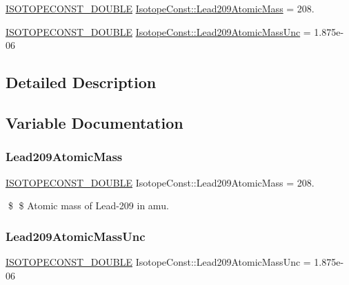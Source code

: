 \begin{DoxyCompactItemize}
\item 
\mbox{\hyperlink{group___isotope_const-_macros_ga8f45a7272ce02c0b4c65c44636ed719a}{I\+S\+O\+T\+O\+P\+E\+C\+O\+N\+S\+T\+\_\+\+D\+O\+U\+B\+LE}} \mbox{\hyperlink{group___isotope_const-_lead-_pb209_ga65a91941f73a72a68eae2553a9efabd9}{Isotope\+Const\+::\+Lead209\+Atomic\+Mass}} = 208.
\item 
\mbox{\hyperlink{group___isotope_const-_macros_ga8f45a7272ce02c0b4c65c44636ed719a}{I\+S\+O\+T\+O\+P\+E\+C\+O\+N\+S\+T\+\_\+\+D\+O\+U\+B\+LE}} \mbox{\hyperlink{group___isotope_const-_lead-_pb209_gaaaf6755189ec4d1e013d747eda546779}{Isotope\+Const\+::\+Lead209\+Atomic\+Mass\+Unc}} = 1.\+875e-\/06
\end{DoxyCompactItemize}


\subsection{Detailed Description}


\subsection{Variable Documentation}
\mbox{\label{group___isotope_const-_lead-_pb209_ga65a91941f73a72a68eae2553a9efabd9}} 
\subsubsection{\texorpdfstring{Lead209\+Atomic\+Mass}{Lead209AtomicMass}}
{\footnotesize\ttfamily \mbox{\hyperlink{group___isotope_const-_macros_ga8f45a7272ce02c0b4c65c44636ed719a}{I\+S\+O\+T\+O\+P\+E\+C\+O\+N\+S\+T\+\_\+\+D\+O\+U\+B\+LE}} Isotope\+Const\+::\+Lead209\+Atomic\+Mass = 208.}

\$ \$ Atomic mass of Lead-\/209 in amu. \mbox{\label{group___isotope_const-_lead-_pb209_gaaaf6755189ec4d1e013d747eda546779}} 
\subsubsection{\texorpdfstring{Lead209\+Atomic\+Mass\+Unc}{Lead209AtomicMassUnc}}
{\footnotesize\ttfamily \mbox{\hyperlink{group___isotope_const-_macros_ga8f45a7272ce02c0b4c65c44636ed719a}{I\+S\+O\+T\+O\+P\+E\+C\+O\+N\+S\+T\+\_\+\+D\+O\+U\+B\+LE}} Isotope\+Const\+::\+Lead209\+Atomic\+Mass\+Unc = 1.\+875e-\/06}


